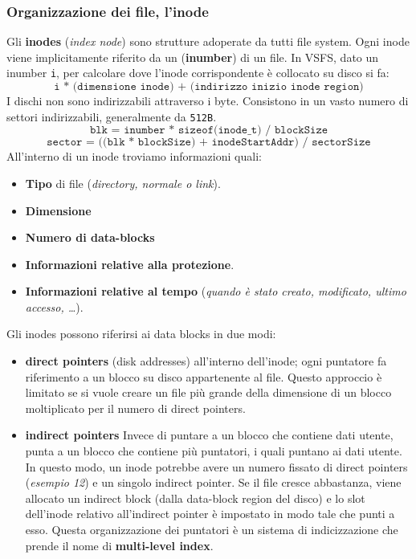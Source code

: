 \documentclass[12pt, letterpaper]{article}
\begin{document}
			\subsubsection{Organizzazione dei file, l'inode}
				Gli \textbf{inodes} (\textit{index node}) sono strutture adoperate da tutti file system. Ogni inode viene implicitamente riferito da un (\textbf{inumber}) di un file. In VSFS, dato un inumber \texttt{i}, per calcolare dove l'inode corrispondente è collocato su disco si fa: $$\texttt{i * (dimensione inode) + (indirizzo inizio inode region)}$$
				I dischi non sono indirizzabili attraverso i byte. Consistono in un vasto numero di settori indirizzabili, generalmente da \texttt{512B}. 
				$$\texttt{blk = inumber * sizeof(inode\_t) / blockSize}$$
				$$\texttt{sector = ((blk * blockSize) + inodeStartAddr) / sectorSize}$$
				All'interno di un inode troviamo informazioni quali: 
				\begin{itemize}
					\item \textbf{Tipo} di file (\textit{directory, normale o link}).
					\item \textbf{Dimensione}
					\item \textbf{Numero di data-blocks}
					\item \textbf{Informazioni relative alla protezione}.
					\item \textbf{Informazioni relative al tempo} (\textit{quando è stato creato, modificato, ultimo accesso, \dots}).
				\end{itemize}
				Gli inodes possono riferirsi ai data blocks in due modi:
				\begin{itemize}
					\item \textbf{direct pointers} (disk addresses) all'interno dell'inode; ogni puntatore fa riferimento a un blocco su disco appartenente al file. Questo approccio è limitato se si vuole creare un file più grande della dimensione di un blocco moltiplicato per il numero di direct pointers.
					\item \textbf{indirect pointers} Invece di puntare a un blocco che contiene dati utente, punta a un blocco che contiene più puntatori, i quali puntano ai dati utente. In questo modo, un inode potrebbe avere un numero fissato di direct pointers (\textit{esempio 12}) e un singolo indirect pointer. Se il file cresce abbastanza, viene allocato un indirect block (dalla data-block region del disco) e lo slot dell'inode relativo all'indirect pointer è impostato in modo tale che punti a esso. Questa organizzazione dei puntatori è un sistema di indicizzazione che prende il nome di \textbf{multi-level index}. 
				\end{itemize}
\end{document}

